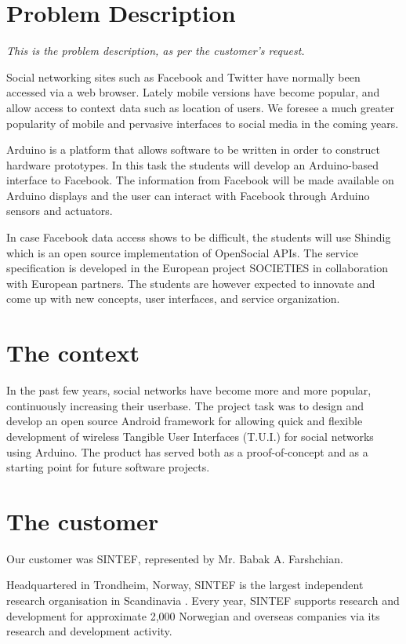 \section{Problem Description}

\emph{This is the problem description, as per the customer's request.}

Social networking sites such as Facebook and Twitter have normally been accessed  via a web browser.
Lately mobile versions have become popular, and allow access to context data such as location of
users. We foresee a much greater popularity of mobile and pervasive interfaces to social media in
the coming years.

Arduino\cite{link:arduino} is a platform that allows software to be written in order to construct
hardware prototypes. In this task the students will develop an Arduino-based interface to Facebook.
The information from Facebook will be made available on Arduino displays and the user can interact
with Facebook through Arduino sensors and actuators.

In case Facebook data access shows to be difficult, the students will use Shindig\cite{link:shinding} which 
is an open source implementation of OpenSocial APIs. The service specification is developed in the European project 
SOCIETIES in collaboration with European partners. The students are however expected to innovate and come up 
with new concepts, user interfaces, and service organization.

\section{The context}
In the past few years, social networks have become more and more popular, continuously increasing their userbase.
The project task was to design and develop an open source Android\cite{link:android} framework for allowing quick
and flexible development of wireless Tangible User Interfaces (T.U.I.) for social networks using Arduino.
The product has served both as a proof-of-concept and as a starting point for future software projects.

\section{The customer}
Our customer was SINTEF, represented by Mr. Babak A. Farshchian.

Headquartered in Trondheim, Norway, SINTEF is the largest independent research organisation in Scandinavia \cite{link:sintef}.
Every year, SINTEF supports research and development for approximate 2,000 Norwegian and overseas
companies via its research and development activity.


